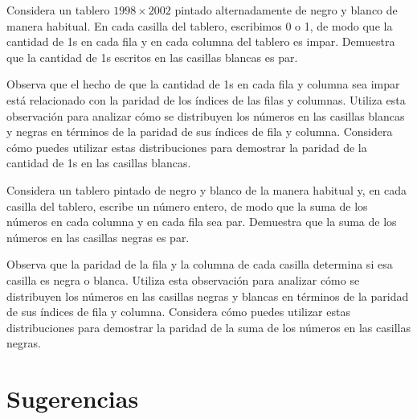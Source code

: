 \documentclass[11pt]{scrartcl}
\begin{document}
\begin{problem}
Considera un tablero $1998 \times 2002$ pintado alternadamente de negro y blanco de manera habitual. En cada casilla del tablero, escribimos 0 o 1, de modo que la cantidad de 1s en cada fila y en cada columna del tablero es impar. Demuestra que la cantidad de 1s escritos en las casillas blancas es par.
\begin{hint}
    Observa que el hecho de que la cantidad de 1s en cada fila y columna sea impar está relacionado con la paridad de los índices de las filas y columnas. Utiliza esta observación para analizar cómo se distribuyen los números en las casillas blancas y negras en términos de la paridad de sus índices de fila y columna. Considera cómo puedes utilizar estas distribuciones para demostrar la paridad de la cantidad de 1s en las casillas blancas.
\end{hint}
\end{problem}

\begin{problem}[Ucrania 1997]
Considera un tablero pintado de negro y blanco de la manera habitual y, en cada casilla del tablero, escribe un número entero, de modo que la suma de los números en cada columna y en cada fila sea par. Demuestra que la suma de los números en las casillas negras es par.
\begin{hint}
    Observa que la paridad de la fila y la columna de cada casilla determina si esa casilla es negra o blanca. Utiliza esta observación para analizar cómo se distribuyen los números en las casillas negras y blancas en términos de la paridad de sus índices de fila y columna. Considera cómo puedes utilizar estas distribuciones para demostrar la paridad de la suma de los números en las casillas negras.
\end{hint}
\end{problem}


\section{Sugerencias}
\begin{enumerate}

\end{enumerate}
\end{document}
